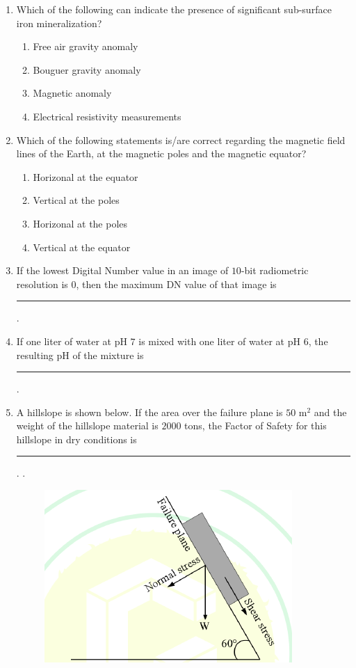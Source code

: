 \documentclass[journal,12pt,onecolumn]{IEEEtran}
\theoremstyle{remark}
\begin{document}
\begin{enumerate}
\item Which of the following can indicate the presence of significant sub-surface iron mineralization? \hfill{}
\begin{enumerate}
    \item Free air gravity anomaly
    \item Bouguer gravity anomaly
    \item Magnetic anomaly
    \item Electrical resistivity measurements
\end{enumerate}

\item Which of the following statements is/are correct regarding the magnetic field lines of the Earth, at the magnetic poles and the magnetic equator? \hfill{}
\begin{enumerate}
    \item Horizonal at the equator
    \item Vertical at the poles
    \item Horizonal at the poles
    \item Vertical at the equator
\end{enumerate}

\item If the lowest Digital Number  value in an image of $10$-bit radiometric resolution is $0$, then the maximum DN value of that image is \rule{3cm}{0.15mm}.  \hfill{}

\item If one liter of water at pH $7$ is mixed with one liter of water at pH $6$, the resulting pH of the mixture is \rule{3cm}{0.15mm}.  \hfill{}

\item A hillslope is shown below. If the area over the failure plane is $50 \text{ m}^2$ and the weight of the hillslope material  is $2000$ tons, the Factor of Safety  for this hillslope in dry conditions is \rule{3cm}{0.15mm}. . 
\begin{figure}[H]
    \centering
    \includegraphics[width=0.5\columnwidth]{figs/fig5.png}
    \caption{}
    \label{fig:q26}
\end{figure}
\hfill{}


\end{enumerate}
\end{document}
